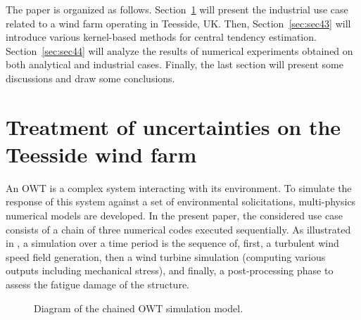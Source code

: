 The paper is organized as follows. 
Section~\ref{sec:sec42} will present the industrial use case related to a wind farm operating in Teesside, UK. 
Then, Section~\ref{sec:sec43} will introduce various kernel-based methods for central tendency estimation. 
Section~\ref{sec:sec44} will analyze the results of numerical experiments obtained on both analytical and industrial cases. 
Finally, the last section will present some discussions and draw some conclusions.


\section{Treatment of uncertainties on the Teesside wind farm}\label{sec:sec42}

An OWT is a complex system interacting with its environment. 
To simulate the response of this system against a set of environmental solicitations, multi-physics numerical models are developed. 
In the present paper, the considered use case consists of a chain of three numerical codes executed sequentially. 
As illustrated in , a simulation over a time period is the sequence of, first, a turbulent wind speed field generation, then a wind turbine simulation (computing various outputs including mechanical stress), and finally, a post-processing phase to assess the fatigue damage of the structure.
\begin{figure}[h!]
\begin{center}
    
\end{center}
\caption{Diagram of the chained OWT simulation model.}
\label{fig:bloc_diagram}
\end{figure}


